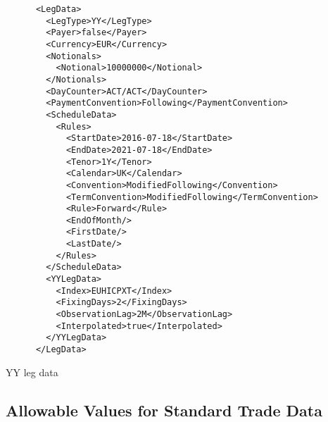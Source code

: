 \begin{listing}[H]
\begin{verbatim}
      <LegData>
        <LegType>YY</LegType>
        <Payer>false</Payer>
        <Currency>EUR</Currency>
        <Notionals>
          <Notional>10000000</Notional>
        </Notionals>
        <DayCounter>ACT/ACT</DayCounter>
        <PaymentConvention>Following</PaymentConvention>
        <ScheduleData>
          <Rules>
            <StartDate>2016-07-18</StartDate>
            <EndDate>2021-07-18</EndDate>
            <Tenor>1Y</Tenor>
            <Calendar>UK</Calendar>
            <Convention>ModifiedFollowing</Convention>
            <TermConvention>ModifiedFollowing</TermConvention>
            <Rule>Forward</Rule>
            <EndOfMonth/>
            <FirstDate/>
            <LastDate/>
          </Rules>
        </ScheduleData>
        <YYLegData>
          <Index>EUHICPXT</Index>
          <FixingDays>2</FixingDays>
          <ObservationLag>2M</ObservationLag>
          <Interpolated>true</Interpolated>
        </YYLegData>
      </LegData>
\end{verbatim}
\caption{YY leg data}
\label{lst:yylegdata}
\end{listing}


\subsection{Allowable Values for Standard Trade Data}
\label{sec:allowable_values}

